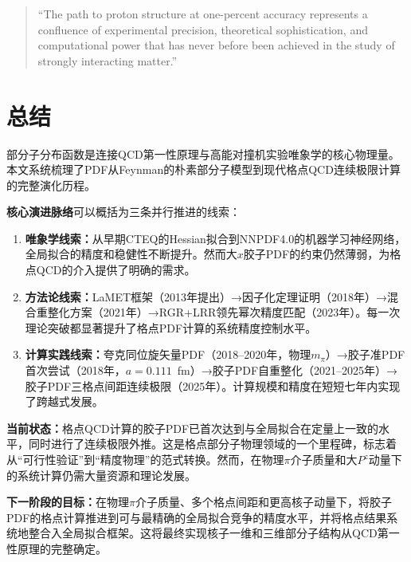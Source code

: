 \documentclass[12pt,a4paper]{ctexart}
\theoremstyle{definition}
\begin{document}
\begin{quote}
``The path to proton structure at one-percent accuracy represents a confluence of experimental precision, theoretical sophistication, and computational power that has never before been achieved in the study of strongly interacting matter.''\cite{NNPDF40}
\end{quote}

\section{总结}

部分子分布函数是连接QCD第一性原理与高能对撞机实验唯象学的核心物理量。本文系统梳理了PDF从Feynman的朴素部分子模型到现代格点QCD连续极限计算的完整演化历程。

\textbf{核心演进脉络}可以概括为三条并行推进的线索：

\begin{enumerate}
    \item \textbf{唯象学线索：}从早期CTEQ的Hessian拟合到NNPDF4.0的机器学习神经网络，全局拟合的精度和稳健性不断提升。然而大$x$胶子PDF的约束仍然薄弱，为格点QCD的介入提供了明确的需求。

    \item \textbf{方法论线索：}LaMET框架（2013年提出）→因子化定理证明（2018年）→混合重整化方案（2021年）→RGR+LRR领先幂次精度匹配（2023年）。每一次理论突破都显著提升了格点PDF计算的系统精度控制水平。

    \item \textbf{计算实践线索：}夸克同位旋矢量PDF（2018--2020年，物理$m_\pi$）→胶子准PDF首次尝试（2018年，$a=0.111$~fm）→胶子PDF自重整化（2021--2025年）→胶子PDF三格点间距连续极限（2025年）。计算规模和精度在短短七年内实现了跨越式发展。
\end{enumerate}

\textbf{当前状态：}格点QCD计算的胶子PDF已首次达到与全局拟合在定量上一致的水平，同时进行了连续极限外推。这是格点部分子物理领域的一个里程碑，标志着从``可行性验证''到``精度物理''的范式转换。然而，在物理$\pi$介子质量和大$P^z$动量下的系统计算仍需大量资源和理论发展。

\textbf{下一阶段的目标：}在物理$\pi$介子质量、多个格点间距和更高核子动量下，将胶子PDF的格点计算推进到可与最精确的全局拟合竞争的精度水平，并将格点结果系统地整合入全局拟合框架。这将最终实现核子一维和三维部分子结构从QCD第一性原理的完整确定。
\end{document}
